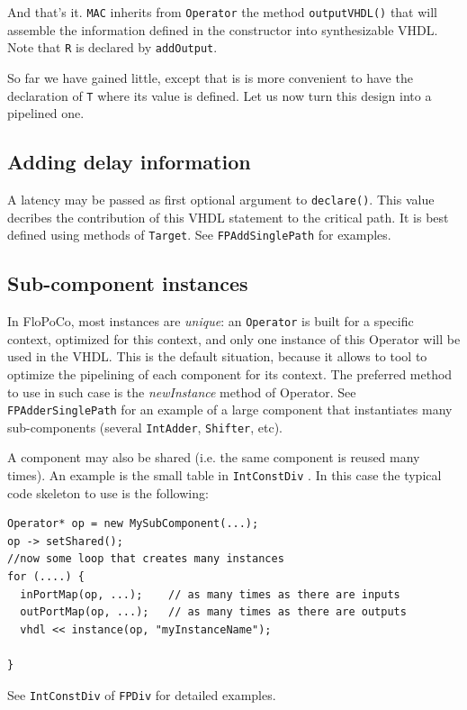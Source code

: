 \documentclass{article}
\begin{document}
And that's it. \verb!MAC! inherits from \verb!Operator! the method
\verb!outputVHDL()! that will assemble the information defined in the
constructor into synthesizable VHDL. Note that \verb!R! is declared by \verb!addOutput!.

So far we have gained little, except that is is more convenient to
have the declaration of \verb!T! where its value is defined. Let us
now turn this design into a pipelined one.

\subsection{Adding delay information}
A latency  may be passed as first optional argument to  \texttt{declare()}.
  This value decribes the contribution of this VHDL statement to the critical path.
  It is best defined using methods of \texttt{Target}.
  See \texttt{FPAddSinglePath} for examples.

\subsection{Sub-component instances}

In FloPoCo, most instances are \emph{unique}: an \texttt{Operator} is built for a specific context, optimized for this context, and only one instance of this Operator will be used in the VHDL.
This is the default situation, because it allows to tool to optimize the pipelining of each component for its context.
The preferred method to use in such case is the \emph{newInstance} method of Operator. 
See \texttt{FPAdderSinglePath} for an example of a large component that instantiates many sub-components (several \texttt{IntAdder}, \texttt{Shifter}, etc).


A component may also be shared (i.e. the same component is reused many times).
An example is the small table in \texttt{IntConstDiv} \cite{dedinechin:2012:ensl-00642145:1}.
In this case the typical code skeleton to use is the following:
\begin{verbatim}
Operator* op = new MySubComponent(...);
op -> setShared();
//now some loop that creates many instances
for (....) {
  inPortMap(op, ...);    // as many times as there are inputs
  outPortMap(op, ...);   // as many times as there are outputs
  vhdl << instance(op, "myInstanceName");

}
\end{verbatim}

See \texttt{IntConstDiv} of \texttt{FPDiv} for detailed examples.
\end{document}
